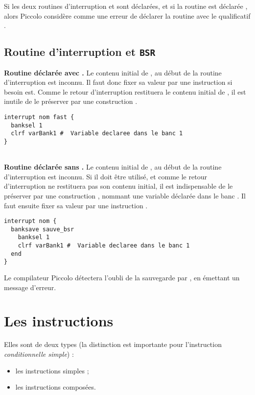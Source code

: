 Si les deux routines d’interruption  et  sont déclarées, et si la routine  est déclarée , alors Piccolo considère comme une erreur de déclarer la routine  avec le qualificatif .






\subsection{Routine d'interruption et \texttt{BSR}}

\textbf{Routine déclarée avec .} Le contenu initial de , au début de la routine d’interruption est inconnu. Il faut donc fixer sa valeur par une instruction  si besoin est. Comme le retour d’interruption restituera le contenu initial de , il est inutile de le préserver par une construction .

\begin{lstlisting}[language=piccolo]
interrupt nom fast {
  banksel 1
  clrf varBank1 #  Variable declaree dans le banc 1
}
\end{lstlisting}

~\\
\textbf{Routine déclarée sans .} Le contenu initial de , au début de la routine d’interruption est inconnu. Si il doit être utilisé, et comme le retour d’interruption ne restituera pas son contenu initial, il est indispensable de le préserver par une construction , nommant une variable  déclarée dans le banc . Il faut ensuite fixer sa valeur par une instruction . 

\begin{lstlisting}[language=piccolo]
interrupt nom {
  banksave sauve_bsr
    banksel 1
    clrf varBank1 #  Variable declaree dans le banc 1
  end
}
\end{lstlisting}

Le compilateur Piccolo détectera l’oubli de la sauvegarde par , en émettant un message d’erreur.


\section{Les instructions}

Elles sont de deux types (la distinction est importante pour l’instruction \emph{conditionnelle simple}) :
\begin{itemize}
  \item les instructions simples ;
  \item les instructions composées.

\end{itemize}



